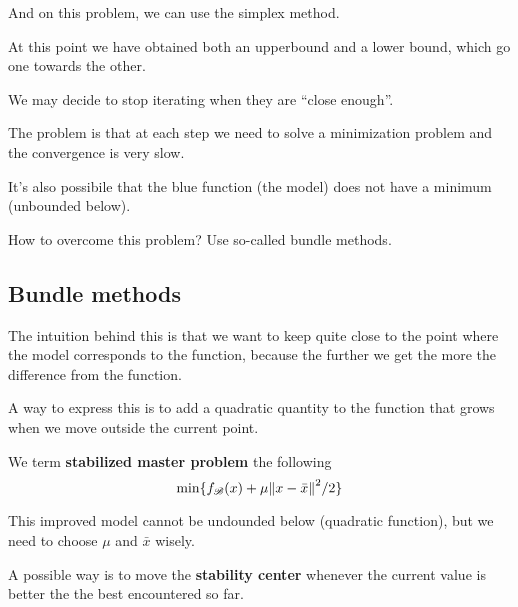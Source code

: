 \documentclass[computational_mathematics.tex]{subfiles}
\begin{document}
And on this problem, we can use the simplex method.


At this point we have obtained both an upperbound and a lower bound, which go one towards the other.

We may decide to stop iterating when they are ``close enough''.

The problem is that at each step we need to solve a minimization problem and the convergence is very slow.

It's also possibile that the blue function (the model) does not have a minimum (unbounded below).

How to overcome this problem? Use so-called bundle methods.

\subsection{Bundle methods}

The intuition behind this is that we want to keep quite close to the point where the model corresponds to the function, because the further we get the more the difference from the function.

A way to express this is to add a quadratic quantity to the function
that grows when we move outside the current point.

\begin{definition}
  We term \textbf{stabilized master problem} the following
  \[
    \min \{f_{\mathscr{B}}(x) + \mu {\left\lVert x - \bar{x}\right\rVert}^2 / 2\}
  \]
\end{definition}

 This improved model cannot be undounded below (quadratic function), but we need to choose $\mu$ and $\bar{x}$ wisely.

 A possible way is to move the \textbf{stability center} whenever the current value is better the the best encountered so far.

\end{document}
